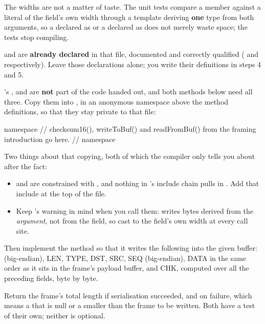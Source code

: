 The widths are not a matter of taste. The unit tests compare a member against a literal of the
field's own width through a template deriving \textbf{one} type from both arguments, so a 
declared as  or a  declared as  does not merely waste
space; the tests stop compiling.

 and  are \textbf{already declared} in that file, documented
and correctly qualified ( and  respectively). Leave those
declarations alone; you write their definitions in steps 4 and 5.

's ,  and  are
\textbf{not} part of the code handed out, and both methods below need all three. Copy them into
, in an anonymous namespace above the method definitions, so that they stay
private to that file:

\begin{cppcode}
namespace
{
// checksum16(), writeToBuf() and readFromBuf() from the framing introduction go here.
} // namespace
\end{cppcode}

Two things about that copying, both of which the compiler only tells you about after the fact:
\begin{itemize}
  \item {} and  are constrained with ,
    and nothing in 's include chain pulls in . Add that include
    at the top of the file.
  \item Keep 's warning in mind when you call them: 
    writes  bytes derived from the \emph{argument}, not from the field, so cast to
    the field's own width at every call site.
\end{itemize}

Then implement the method  so that it writes the following into the
given buffer:  (big-endian), LEN, TYPE, DST, SRC, SEQ (big-endian), DATA in the
same order as it sits in the frame's payload buffer, and CHK, computed over all the preceding fields,
byte by byte.

Return the frame's total length if serialisation succeeded, and  on failure, which means a
 that is null or a  smaller than the frame to be written. Both have a test of
their own; neither is optional.

